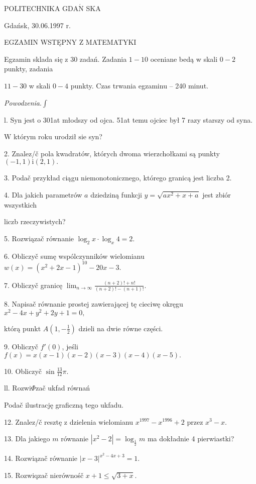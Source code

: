 \documentclass[a4paper,12pt]{article}
\begin{document}
POLITECHNIKA $\mathrm{G}\mathrm{D}\mathrm{A}\acute{\mathrm{N}}$ SKA

Gdańsk, 30.06.1997 r.

EGZAMIN WSTĘPNY Z MATEMATYKI

Egzamin sklada się z 30 zadań. Zadania $1-10$ oceniane bedą w skali $0-2$ punkty, zadania

$11-30$ w skali $0-4$ punkty. Czas trwania egzaminu -- 240 minut.

{\it Powodzenia}.$\displaystyle \int$

l. Syn jest o 301at młodszy od ojca. 51at temu ojciec był 7 razy starszy od syna.

$\mathrm{W}$ którym roku urodził $\mathrm{s}\mathrm{i}\mathrm{e}$ syn?

2. Znalez/č pola kwadratów, których dwoma wierzchołkami są punkty $(-1,1)\mathrm{i}(2,1).$

3. Podač przykład ciągu niemonotonicznego, którego granicą jest liczba 2.

4. Dla jakich parametrów $a$ dziedziną funkcji $y = \sqrt{ax^{2}+x+a}$ jest zbiór wszystkich

liczb rzeczywistych?

5. Rozwiązač równanie $\log_{2}x\cdot\log_{x}4=2.$

6. Obliczyč sumę wspólczynników wielomianu $w(x)=(x^{2}+2x-1)^{10}-20x-3.$

7. Obliczyč granicę $\displaystyle \lim_{n\rightarrow\infty}\frac{(n+2)!+n!}{(n+2)!-(n+1)!}.$

8. Napisač równanie prostej zawierającej tę cieciwę okręgu $x^{2}-4x+y^{2}+2y+1 =0,$

którą punkt $A(1,-\displaystyle \frac{1}{2})$ dzieli na dwie równe części.

9. Obliczyč $f'(0)$, jeśli $f(x)=x(x-1)(x-2)(x-3)(x-4)(x-5).$

10. Obliczyč $\displaystyle \sin\frac{13}{12}\pi.$

ll. Rozwi$\Phi$zač ukfad równań 

Podač ilustrację graficzną tego ukfadu.

12. Znalez/č resztę z dzielenia wielomianu $x^{1997}-x^{1996}+2$ przez $x^{3}-x.$

13. Dla jakiego $m$ równanie $|x^{2}-2|=\log_{\frac{1}{2}}m$ ma dokładnie 4 pierwiastki?

14. Rozwiązač równanie $|x-3|^{x^{2}-4x+3}=1.$

15. Rozwiqzač nierównośč $x+1\leq\sqrt{3+x}.$
\end{document}
